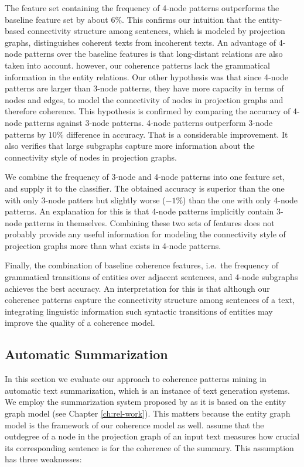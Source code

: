 The feature set containing the frequency of 4-node patterns outperforms the baseline feature set by about $6\%$. 
This confirms our intuition that the entity-based connectivity structure among sentences, which is modeled by projection graphs, distinguishes coherent texts from incoherent texts. 
An advantage of 4-node patterns over the baseline features is that long-distant relations are also taken into account. 
however, our coherence patterns lack the grammatical information in the entity relations. 
Our other hypothesis was that since 4-node patterns are larger than 3-node patterns, they have more capacity in terms of nodes and edges, to model the connectivity of nodes in projection graphs and therefore coherence. 
This hypothesis is confirmed by comparing the accuracy of 4-node patterns against 3-node patterns.
4-node patterns outperform 3-node patterns by $10\%$ difference in accuracy. 
That is a considerable improvement. 
It also verifies that large subgraphs capture more information about the connectivity style of nodes in projection graphs.    

We combine the frequency of 3-node and 4-node patterns into one feature set, and supply it to the classifier.   
The obtained accuracy is superior than the one with only 3-node patters but slightly worse  ($-1\%$) than the one with only 4-node patterns. 
An explanation for this is that 4-node patterns implicitly contain 3-node patterns in themselves. 
Combining these two sets of features does not probably provide any useful information for modeling the connectivity style of projection graphs more than what exists in 4-node patterns. 

Finally, the combination of baseline coherence features, i.e.\ the frequency of grammatical transitions of entities over adjacent sentences, and 4-node subgraphs achieves the best accuracy. 
An interpretation for this is that although our coherence patterns capture the connectivity structure among sentences of a text, integrating linguistic information such syntactic transitions of entities may improve the quality of a coherence model.  

\subsection{Automatic Summarization}
\label{sec:auto-summarization}
In this section we evaluate our approach to coherence patterns mining in automatic text summarization, which is an instance of text generation systems. 
We employ the summarization system proposed by  as it is based on the entity graph model (see Chapter \ref{ch:rel-work}). 
This matters because the entity graph model is the framework of our coherence model as well.  
 assume that the outdegree of a node in the projection graph of an input text measures how crucial its corresponding sentence is for the coherence of the summary.  
This assumption has three weaknesses: 

